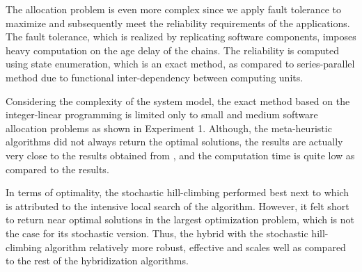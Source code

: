 The allocation problem is even more complex since we apply fault tolerance to maximize and subsequently meet the reliability requirements of the applications. The fault tolerance, which is realized by replicating software components, imposes heavy computation on the age delay of the chains. The reliability is computed using state enumeration, which is an exact method, as compared to series-parallel method due to functional inter-dependency between computing units.

Considering the complexity of the system model, the exact method based on the integer-linear programming is limited only to small and medium software allocation problems as shown in Experiment 1. Although, the meta-heuristic algorithms did not always return the optimal solutions, the results are actually very close to the results obtained from \ilp, and the computation time is quite low as compared to the \ilp results.

In terms of optimality, the stochastic hill-climbing performed best next to \ilp which is attributed to the intensive local search of the algorithm. However, it felt short to return near optimal solutions in the largest optimization problem, which is not the case for its stochastic version. Thus, the hybrid \pso{} with the stochastic hill-climbing algorithm relatively more robust, effective and scales well as compared to the rest of the hybridization algorithms.

